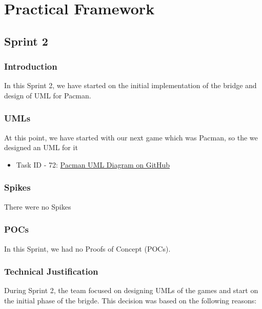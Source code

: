 \section{Practical Framework}


\subsection{Sprint 2}

\subsubsection{Introduction}

In this Sprint 2, we have started on the initial implementation of the bridge and design of UML for Pacman.

\subsubsection{UMLs}

At this point, we have started with our next game which was Pacman, so the we designed an UML for it

\begin{itemize}
    \item Task ID - 72: \href{https://github.com/Pending-Name-21/arquitecture/pull/11}{Pacman UML Diagram on GitHub}
\end{itemize}

\subsubsection{Spikes}

There were no Spikes

\subsubsection{POCs}

In this Sprint, we had no Proofs of Concept (POCs).

\subsubsection{Technical Justification}

During Sprint 2, the team focused on designing UMLs of the games
and start on the initial phase of the brigde. This decision was based on the following reasons:

